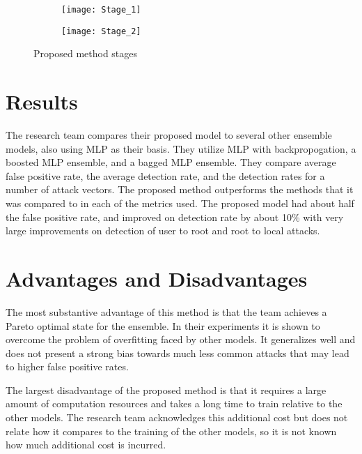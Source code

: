 \documentclass[]{article}
\begin{document}
\begin{figure}[h]
	\centering
	\begin{subfigure}{0.48\linewidth}
		\texttt{[image: Stage\_1]}
	\end{subfigure}
	\hfill
	\begin{subfigure}{0.48\linewidth}
		\texttt{[image: Stage\_2]}
	\end{subfigure}
	\caption{Proposed method stages \cite{Zhao2020}}
\end{figure}


\section{Results}

The research team compares their proposed model to several other ensemble models, also using MLP as their basis.
They utilize MLP with backpropogation, a boosted MLP ensemble, and a bagged MLP ensemble.
They compare average false positive rate, the average detection rate, and the detection rates for a number of attack vectors. 
The proposed method outperforms the methods that it was compared to in each of the metrics used.
The proposed model had about half the false positive rate, and improved on detection rate by about 10\% with very large improvements on detection of user to root and root to local attacks.

\section{Advantages and Disadvantages}

The most substantive advantage of this method is that the team achieves a Pareto optimal state for the ensemble.
In their experiments it is shown to overcome the problem of overfitting faced by other models.
It generalizes well and does not present a strong bias towards much less common attacks that may lead to higher false positive rates.

The largest disadvantage of the proposed method is that it requires a large amount of computation resources and takes a long time to train relative to the other models.
The research team acknowledges this additional cost but does not relate how it compares to the training of the other models, so it is not known how much additional cost is incurred.
\end{document}
